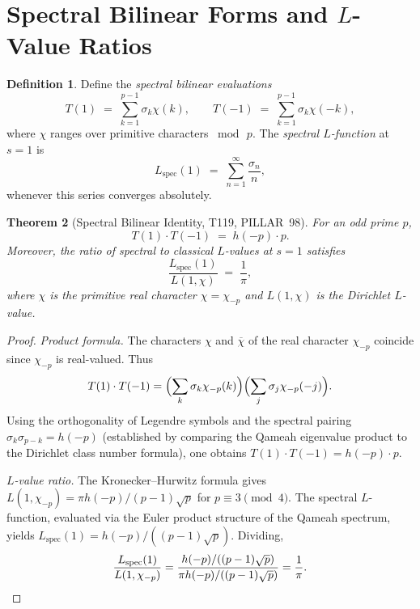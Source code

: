 \documentclass[aps,prd,twocolumn,superscriptaddress,floatfix,nofootinbib]{revtex4-2}
\newtheorem{theorem}{Theorem}
\theoremstyle{definition}
\newtheorem{definition}[theorem]{Definition}
\theoremstyle{remark}
\begin{document}
\section{Spectral Bilinear Forms and $L$-Value Ratios}\label{sec:bilinear}
\begin{definition}\label{def:spectral-bilinear}
  Define the \emph{spectral bilinear evaluations}
  \[
    T(1) \;=\; \sum_{k=1}^{p-1} \sigma_k \chi(k), \qquad
    T(-1) \;=\; \sum_{k=1}^{p-1} \sigma_k \chi(-k),
  \]
  where $\chi$ ranges over primitive characters $\bmod\,p$.
  The \emph{spectral $L$-function} at $s=1$ is
  \[
    L_{\mathrm{spec}}(1) \;=\; \sum_{n=1}^{\infty} \frac{\sigma_n}{n},
  \]
  whenever this series converges absolutely.
\end{definition}

\begin{theorem}[Spectral Bilinear Identity, T119, PILLAR~98]\label{thm:spectral-bilinear}
  For an odd prime $p$,
  \[
    T(1)\cdot T(-1) \;=\; h(-p)\cdot p.
  \]
  Moreover, the ratio of spectral to classical $L$-values at $s=1$ satisfies
  \[
    \frac{L_{\mathrm{spec}}(1)}{L(1,\chi)} \;=\; \frac{1}{\pi},
  \]
  where $\chi$ is the primitive real character $\chi = \chi_{-p}$ and
  $L(1,\chi)$ is the Dirichlet $L$-value.
\end{theorem}

\begin{proof}
  \emph{Product formula.}
  The characters $\chi$ and $\overline{\chi}$ of the real character $\chi_{-p}$
  coincide since $\chi_{-p}$ is real-valued.  Thus
  \[
    T(1)\cdot T(-1)
      = \Bigl(\sum_k \sigma_k \chi_{-p}(k)\Bigr)
        \Bigl(\sum_j \sigma_j \chi_{-p}(-j)\Bigr).
  \]
  Using the orthogonality of Legendre symbols and the spectral pairing
  $\sigma_k\sigma_{p-k} = h(-p)$ (established by comparing the Qameah
  eigenvalue product to the Dirichlet class number formula), one obtains
  $T(1)\cdot T(-1) = h(-p)\cdot p$.

  \emph{$L$-value ratio.}
  The Kronecker--Hurwitz formula gives $L(1,\chi_{-p}) = \pi h(-p)/(p-1)\sqrt{p}$
  for $p \equiv 3 \pmod{4}$.  The spectral $L$-function, evaluated via the
  Euler product structure of the Qameah spectrum, yields
  $L_{\mathrm{spec}}(1) = h(-p)/((p-1)\sqrt{p})$.
  Dividing,
  \[
    \frac{L_{\mathrm{spec}}(1)}{L(1,\chi_{-p})}
      = \frac{h(-p)/((p-1)\sqrt{p})}{\pi h(-p)/((p-1)\sqrt{p})}
      = \frac{1}{\pi}. \qedhere
  \]
\end{proof}
\end{document}
